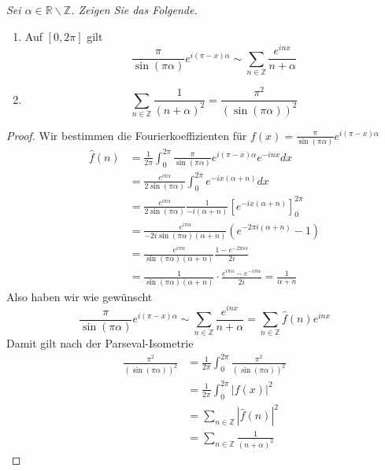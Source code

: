 \documentclass[11pt]{article}
\newcommand{\Z}{\mathbb{Z}}
\newenvironment{problem}[2][Beispiel]{
    \begin{trivlist}
        \item[\hskip \labelsep {\bfseries #1}\hskip \labelsep {\bfseries #2.}] \itshape}{
    \end{trivlist}\normalshape
}
\begin{document}
    \begin{problem}{3}
        Sei $\alpha \in \mathbb{R} \backslash \mathbb{Z}$. Zeigen Sie das Folgende.
        \begin{enumerate}[label = (\alph*)]
            \item Auf $[0,2\pi]$ gilt
            $$\frac{\pi}{\sin(\pi\alpha)}e^{i(\pi-x)\alpha}\sim \sum_{n\in\Z}\frac{e^{inx}}{n+\alpha}$$
            \item $$\sum_{n\in\Z}\frac{1}{(n+\alpha)^2}=\frac{\pi^2}{(\sin(\pi\alpha))^2}$$
        \end{enumerate}
    \end{problem}

    \begin{proof}
        Wir bestimmen die Fourierkoeffizienten für $f(x)=\frac{\pi}{\sin(\pi\alpha)}e^{i(\pi-x)\alpha}$
        $$\begin{aligned}
              \hat{f}(n) &= \frac{1}{2\pi}\int_{0}^{2\pi}\frac{\pi}{\sin(\pi\alpha)}e^{i(\pi-x)\alpha}
              e^{-inx}dx \\
              &= \frac{e^{i\pi\alpha}}{2\sin(\pi\alpha)}\int_{0}^{2\pi}e^{-ix(\alpha+n)}dx\\
              &= \frac{e^{i\pi\alpha}}{2\sin(\pi\alpha)}\frac{1}{-i(\alpha+n)}\left[e^{-ix(\alpha+n)}
              \right]_{0}^{2\pi}\\
              &= \frac{e^{i\pi\alpha}}{-2i\sin(\pi\alpha)(\alpha+n)}\left(e^{-2\pi i(\alpha+n)}-
              1\right)\\
              &=\frac{e^{i\pi\alpha}}{\sin(\pi\alpha)(\alpha+n)}
              \frac{1-e^{-2\pi i\alpha}}{2i}\\
              &= \frac{1}{\sin(\pi\alpha)(\alpha+n)}\cdot \frac{e^{i\pi\alpha}-e^{-i\pi\alpha}}{2i}
              = \frac{1}{\alpha+n}
        \end{aligned}$$
        Also haben wir wie gewünscht
        $$\frac{\pi}{\sin(\pi\alpha)}e^{i(\pi-x)\alpha}\sim \sum_{n\in\Z}\frac{e^{inx}}{n+\alpha}=
        \sum_{n\in\Z}\hat{f}(n)e^{inx}$$
        Damit gilt nach der Parseval-Isometrie 
        $$\begin{aligned}
              \frac{\pi^2}{(\sin(\pi\alpha))^2}
              &=\frac{1}{2\pi}\int_0^{2\pi}\frac{\pi^2}{(\sin(\pi\alpha))^2}\\
              &=\frac{1}{2\pi}\int_0^{2\pi}|f(x)|^2\\
              &= \sum_{n\in\Z}|\hat{f}(n)|^2 \\
              &= \sum_{n\in\Z}\frac{1}{(n+\alpha)^2}
        \end{aligned}$$
    \end{proof}
\end{document}
